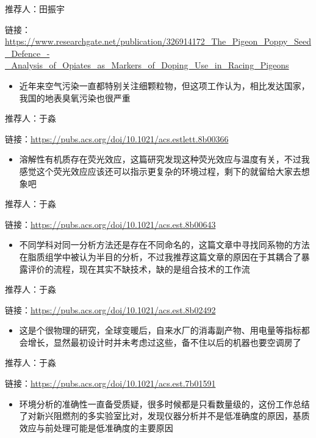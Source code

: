 \documentclass[
]{book}
\providecommand{\tightlist}{%
  \setlength{\itemsep}{0pt}\setlength{\parskip}{0pt}}
\begin{document}
推荐人：田振宇

链接：\url{https://www.researchgate.net/publication/326914172_The_Pigeon_Poppy_Seed_Defence_-_Analysis_of_Opiates_as_Markers_of_Doping_Use_in_Racing_Pigeons}

\begin{itemize}
\tightlist
\item
  近年来空气污染一直都特别关注细颗粒物，但这项工作认为，相比发达国家，我国的地表臭氧污染也很严重
\end{itemize}

推荐人：于淼

链接：\url{https://pubs.acs.org/doi/10.1021/acs.estlett.8b00366}

\begin{itemize}
\tightlist
\item
  溶解性有机质存在荧光效应，这篇研究发现这种荧光效应与温度有关，不过我感觉这个荧光效应应该还可以指示更复杂的环境过程，剩下的就留给大家去想象吧
\end{itemize}

推荐人：于淼

链接：\url{https://pubs.acs.org/doi/10.1021/acs.est.8b00643}

\begin{itemize}
\tightlist
\item
  不同学科对同一分析方法还是存在不同命名的，这篇文章中寻找同系物的方法在脂质组学中被认为半目的分析，不过我推荐这篇文章的原因在于其耦合了暴露评价的流程，现在其实不缺技术，缺的是组合技术的工作流
\end{itemize}

推荐人：于淼

链接：\url{https://pubs.acs.org/doi/10.1021/acs.est.8b02492}

\begin{itemize}
\tightlist
\item
  这是个很物理的研究，全球变暖后，自来水厂的消毒副产物、用电量等指标都会增长，显然最初设计时并未考虑过这些，备不住以后的机器也要空调房了
\end{itemize}

推荐人：于淼

链接：\url{https://pubs.acs.org/doi/10.1021/acs.est.7b01591}

\begin{itemize}
\tightlist
\item
  环境分析的准确性一直备受质疑，很多时候都是只看数量级的，这份工作总结了对新兴阻燃剂的多实验室比对，发现仪器分析并不是低准确度的原因，基质效应与前处理可能是低准确度的主要原因
\end{itemize}
\end{document}
